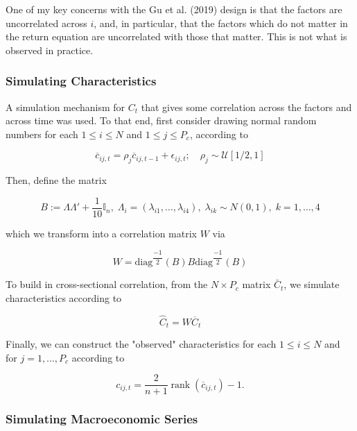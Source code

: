 \documentclass[man, a4paper, biblatex]{article}
\newcommand{\smalltodo}[2][] {\todo[caption={#2}, size=\scriptsize,%
	fancyline,#1]{\begin{spacing}{.5}#2\end{spacing}}}
\newcommand{\rhs}[2][]{\smalltodo[color=green!30,#1]{{\bf RS:} #2}}
\begin{document}
\rhs{justify properly}

One of my key concerns with the Gu et al. (2019) design is that the factors are uncorrelated across $i$, and, in particular, that the factors which do not matter in the return equation are uncorrelated with those that matter. This is not what is observed in practice. 

\subsubsection{Simulating Characteristics}

A simulation mechanism for $C_t$ that gives some correlation across the factors and across time was used. To that end, first consider drawing normal random numbers for each $1\leq i\leq N$ and $1\leq j\leq P_{c}$, according to 

\begin{equation}
	\overline{c}_{i j, t} = \rho_{j} \overline{c}_{i j, t-1}+\epsilon_{i j, t} ;
	\quad \rho_{j} \sim \mathcal{U}[1/2,1]
\end{equation}

Then, define the matrix 

\begin{equation}
	B:=\Lambda\Lambda' + \frac{1}{10}\mathbb{I}_{n}, \;
	\Lambda_i = (\lambda_{i1},\dots,\lambda_{i4}), \;
	\lambda_{ik}\sim N(0,1), \; k=1,\dots,4
\end{equation}

which we transform into a correlation matrix $W$ via

\begin{equation}
	W = \text{diag}^{\dfrac{-1}{2}}(B)B\text{diag}^{\dfrac{-1}{2}}(B)
\end{equation}

To build in cross-sectional correlation, from the $N\times P_{c}$ matrix $\bar{C}_t$, we simulate characteristics according to
 
\begin{equation}
	\widehat{C}_{t}=W\overline{C}_{t}
\end{equation}
 
Finally, we can construct the "observed" characteristics for each $1\leq i\leq N$ and for $j=1, \dots, P_{c}$ according to 

\begin{equation}
	c_{i j, t} = \frac{2}{n+1} \operatorname{rank}\left(\overline{c}_{i j, t}\right)-1.
\end{equation}

\subsubsection{Simulating Macroeconomic Series}
\end{document}
